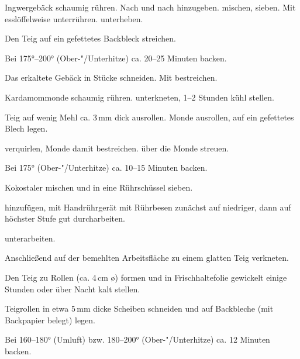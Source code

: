 \begin{recipe}{Ingwergebäck}
  schaumig rühren. Nach und nach
  hinzugeben.
  mischen, sieben. Mit
  esslöffelweise unterrühren.
  unterheben.

  Den Teig auf ein gefettetes Backbleck streichen.

  Bei 175°--200° (Ober-"/Unterhitze) ca. 20--25 Minuten backen.

  Das erkaltete Gebäck in Stücke schneiden. Mit
  bestreichen.
\end{recipe}



\begin{recipe}{Kardamommonde}
  schaumig rühren.
  unterkneten, 1--2 Stunden kühl stellen.

  Teig auf wenig Mehl ca. 3\,mm dick ausrollen. Monde ausrollen, auf ein
  gefettetes Blech legen.

  verquirlen, Monde damit bestreichen.
  über die Monde streuen.

  Bei 175° (Ober-"/Unterhitze) ca. 10--15 Minuten backen.
\end{recipe}



\begin{recipe}{Kokostaler}
  mischen und in eine Rührschüssel sieben.

  hinzufügen, mit Handrührgerät mit Rührbesen zunächst auf niedriger,
  dann auf höchster Stufe gut durcharbeiten.

  unterarbeiten.
  
  Anschließend auf der bemehlten Arbeitsfläche zu einem glatten Teig
  verkneten.
  
  Den Teig zu Rollen (ca. 4\,cm \o) formen und in Frischhaltefolie gewickelt
  einige Stunden oder über Nacht kalt stellen.
  
  Teigrollen in etwa 5\,mm dicke Scheiben schneiden und auf Backbleche
  (mit Backpapier belegt) legen.

  Bei 160--180° (Umluft) bzw. 180--200° (Ober-"/Unterhitze) ca. 12 Minuten backen.
\end{recipe}



